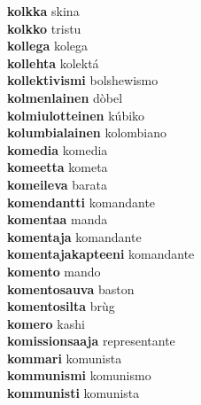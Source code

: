 \textbf{kolkka } skina \\
\textbf{kolkko } tristu \\
\textbf{kollega } kolega \\
\textbf{kollehta } kolektá \\
\textbf{kollektivismi } bolshewismo \\
\textbf{kolmenlainen } dòbel \\
\textbf{kolmiulotteinen } kúbiko \\
\textbf{kolumbialainen } kolombiano \\
\textbf{komedia } komedia \\
\textbf{komeetta } kometa \\
\textbf{komeileva } barata \\
\textbf{komendantti } komandante \\
\textbf{komentaa } manda \\
\textbf{komentaja } komandante \\
\textbf{komentajakapteeni } komandante \\
\textbf{komento } mando \\
\textbf{komentosauva } baston \\
\textbf{komentosilta } brùg \\
\textbf{komero } kashi \\
\textbf{komissionsaaja } representante \\
\textbf{kommari } komunista \\
\textbf{kommunismi } komunismo \\
\textbf{kommunisti } komunista \\
